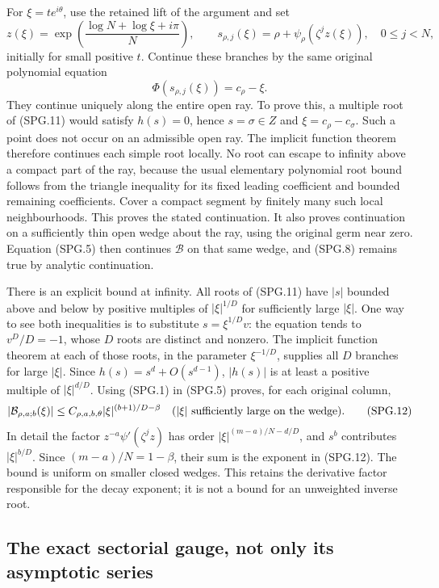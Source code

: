 For \(\xi=t e^{i\theta}\), use the retained lift of the argument
and set
\[
 z(\xi)=\exp\left(\frac{\log N+\log\xi+i\pi}{N}\right),
 \qquad s_{\rho,j}(\xi)=\rho+\psi_\rho(\zeta^jz(\xi)),
 \quad 0\le j<N,
 \tag{SPG.10}\label{eq:spg-lifts}
\]
initially for small positive \(t\). Continue these branches by the
same original polynomial equation
\[
 \Phi(s_{\rho,j}(\xi))=c_\rho-\xi.
 \tag{SPG.11}\label{eq:spg-inverse-polynomial}
\]
They continue uniquely along the entire open ray. To prove this, a
multiple root of (SPG.11) would satisfy \(h(s)=0\), hence
\(s=\sigma\in Z\) and \(\xi=c_\rho-c_\sigma\). Such a point
does not occur on an admissible open ray. The implicit function
theorem therefore continues each simple root locally. No root can
escape to infinity above a compact part of the ray, because the
usual elementary polynomial root bound follows from the triangle
inequality for its fixed leading coefficient and bounded remaining
coefficients. Cover a compact segment by finitely many such local
neighbourhoods. This proves the stated continuation. It also proves
continuation on a sufficiently thin open wedge about the ray, using
the original germ near zero. Equation (SPG.5) then continues
\(\mathcal B\) on that same wedge, and (SPG.8) remains true by
analytic continuation.

There is an explicit bound at infinity. All roots of (SPG.11) have
\(|s|\) bounded above and below by positive multiples of
\(|\xi|^{1/D}\) for sufficiently large \(|\xi|\). One way to
see both inequalities is to substitute \(s=\xi^{1/D}v\): the
equation tends to \(v^D/D=-1\), whose \(D\) roots are distinct
and nonzero. The implicit function theorem at each of those roots,
in the parameter \(\xi^{-1/D}\), supplies all \(D\) branches
for large \(|\xi|\). Since \(h(s)=s^d+O(s^{d-1})\),
\(|h(s)|\) is at least a positive multiple of \(|\xi|^{d/D}\).
Using (SPG.1) in (SPG.5) proves, for each original column,
\[
 |\mathcal B_{\rho,a;b}(\xi)|
       \le C_{\rho,a,b,\theta}
                   |\xi|^{(b+1)/D-\beta}
       \quad (|\xi|\hbox{ sufficiently large on the wedge}).
 \tag{SPG.12}\label{eq:spg-infinity}
\]
In detail the factor \(z^{-a}\psi'(\zeta^jz)\) has order
\(|\xi|^{(m-a)/N-d/D}\), and \(s^b\) contributes
\(|\xi|^{b/D}\). Since \((m-a)/N=1-\beta\), their sum is
the exponent in (SPG.12). The bound is uniform on smaller closed
wedges. This retains the derivative factor responsible for the
decay exponent; it is not a bound for an unweighted inverse root.

\subsection{The exact sectorial gauge, not only its asymptotic series}

